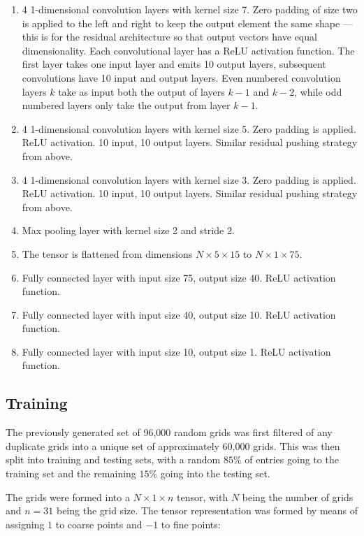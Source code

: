 \begin{enumerate}
\item 4 1-dimensional convolution layers with kernel size 7.  Zero padding of size two is applied to the left and right to keep the output element the same shape --- this is for the residual architecture so that output vectors have equal dimensionality.  Each convolutional layer has a ReLU activation function.  The first layer takes one input layer and emits 10 output layers, subsequent convolutions have 10 input and output layers.  Even numbered convolution layers $k$ take as input both the output of layers $k-1$ and $k-2$, while odd numbered layers only take the output from layer $k-1$.
\item 4 1-dimensional convolution layers with kernel size 5.  Zero padding is applied.  ReLU activation.  10 input, 10 output layers.  Similar residual pushing strategy from above.
\item 4 1-dimensional convolution layers with kernel size 3.  Zero padding is applied.  ReLU activation.  10 input, 10 output layers.  Similar residual pushing strategy from above.
\item Max pooling layer with kernel size 2 and stride 2.
\item The tensor is flattened from dimensions $N \times 5 \times 15$ to $N \times 1 \times 75$.
\item Fully connected layer with input size 75, output size 40.  ReLU activation function.
\item Fully connected layer with input size 40, output size 10.  ReLU activation function.
\item Fully connected layer with input size 10, output size 1.  ReLU activation function.
\end{enumerate}

\subsection{Training}

The previously generated set of 96,000 random grids was first filtered of any duplicate grids into a unique set of approximately 60,000 grids.  This was then split into training and testing sets, with a random $85\%$ of entries going to the training set and the remaining $15\%$ going into the testing set.

The grids were formed into a $N\times 1 \times n$ tensor, with $N$ being the number of grids and $n=31$ being the grid size.  The tensor representation was formed by means of assigning $1$ to coarse points and $-1$ to fine points:

